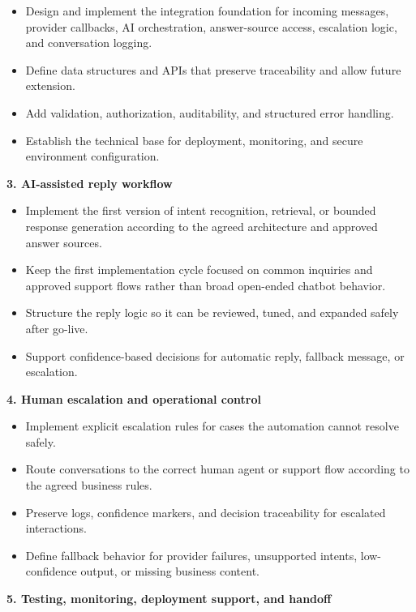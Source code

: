 \documentclass[11pt,a4paper]{article}
\begin{document}
\begin{itemize}
\item Design and implement the integration foundation for incoming messages, provider callbacks, AI orchestration, answer-source access, escalation logic, and conversation logging.
\item Define data structures and APIs that preserve traceability and allow future extension.
\item Add validation, authorization, auditability, and structured error handling.
\item Establish the technical base for deployment, monitoring, and secure environment configuration.
\end{itemize}

\textbf{3. AI-assisted reply workflow}\par

\begin{itemize}
\item Implement the first version of intent recognition, retrieval, or bounded response generation according to the agreed architecture and approved answer sources.
\item Keep the first implementation cycle focused on common inquiries and approved support flows rather than broad open-ended chatbot behavior.
\item Structure the reply logic so it can be reviewed, tuned, and expanded safely after go-live.
\item Support confidence-based decisions for automatic reply, fallback message, or escalation.
\end{itemize}

\textbf{4. Human escalation and operational control}\par

\begin{itemize}
\item Implement explicit escalation rules for cases the automation cannot resolve safely.
\item Route conversations to the correct human agent or support flow according to the agreed business rules.
\item Preserve logs, confidence markers, and decision traceability for escalated interactions.
\item Define fallback behavior for provider failures, unsupported intents, low-confidence output, or missing business content.
\end{itemize}

\textbf{5. Testing, monitoring, deployment support, and handoff}\par
\end{document}
